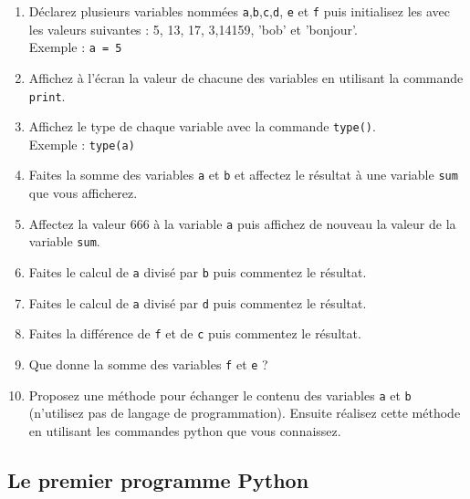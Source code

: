 \begin{enumerate}


\item        Déclarez        plusieurs        variables        nommées
  \texttt{a},\texttt{b},\texttt{c},\texttt{d},      \texttt{e}      et
  \texttt{f} puis initialisez les avec  les valeurs suivantes : 5, 13,
  17, 3,14159, 'bob' et 'bonjour'.\\ Exemple : \texttt{a = 5}



\item  Affichez  à l'écran  la  valeur  de  chacune des  variables  en
  utilisant la commande \texttt{print}.

\item  Affichez   le  type  de   chaque  variable  avec   la  commande
  \texttt{type()}.\\ Exemple : \texttt{type(a)}

\item Faites la somme des variables \texttt{a} et \texttt{b} et affectez
  le  résultat  à  une   variable  \texttt{sum}  que vous afficherez.

\item Affectez la valeur 666 à la variable \texttt{a} puis affichez de
  nouveau la valeur de la variable \texttt{sum}.

\item  Faites  le calcul  de  \texttt{a}  divisé par  \texttt{b}  puis
  commentez le résultat.

\item  Faites  le calcul  de  \texttt{a}  divisé par  \texttt{d}  puis
  commentez le résultat.

\item  Faites  la  différence  de \texttt{f}  et  de  \texttt{c}  puis
  commentez le résultat.

\item Que donne la somme des variables \texttt{f} et \texttt{e} ?

\item  Proposez une  méthode pour  échanger le  contenu des  variables
  \texttt{a}   et   \texttt{b}   (n'utilisez   pas   de   langage   de
  programmation).   Ensuite réalisez  cette méthode  en utilisant  les
  commandes python que vous connaissez.

\end{enumerate}


\subsection{Le premier programme Python}

